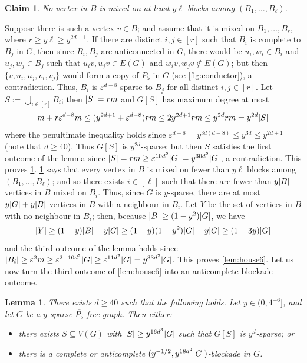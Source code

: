 \documentclass[11pt,reqno,a4paper]{amsart}
\newtheorem{lemma}[theorem]{Lemma}
\newtheorem{claim}{Claim}[theorem]
\let\oldendproof\endproof
\renewenvironment{proof}[1][\proofname]{%
	\oldproof[\normalfont\bfseries #1]%
}{\oldendproof}
\renewcommand{\qedsymbol}{$\blacksquare$}%
\newenvironment{subproof}[1][\normalfont\it Subproof]{%
	\renewcommand{\qedsymbol}{$\square$}%
	\begin{proof}[#1]%
	}{%
	\end{proof}%
}
\newcommand{\eps}{\varepsilon}
\newcommand{\nin}{\notin}
\renewcommand{\subset}{\subseteq}
\DeclarePairedDelimiter\abs{\lvert}{\rvert}%
\begin{document}
\begin{proof}
		\begin{claim}
			\label{claim:mixed}
			No vertex in $B$ is mixed on at least $y\ell$ blocks among $(B_1,\ldots,B_{\ell})$.
		\end{claim}
		\begin{subproof}
			Suppose there is such a vertex $v\in B$;
			and assume that it is mixed on $B_1,\ldots,B_r$, where $r\ge y\ell\ge y^{2d+1}$.
			If there are distinct $i,j\in[r]$ such that $B_i$ is complete to $B_j$ in $G$,
			then since $B_i,B_j$ are anticonnected in $G$,
			there would be $u_i,w_i\in B_i$ and $u_j,w_j\in B_j$ such that $u_iv,u_jv\in E(G)$ and $w_iv,w_jv\nin E(G)$;
			but then $\{v,u_i,u_j,v_i,v_j\}$ would form a copy of $\overline{P_5}$ in $G$ (see \cref{fig:conductor}), a contradiction.
			Thus, $B_i$ is $\eps^{d-8}$-sparse to $B_j$ for all distinct $i,j\in[r]$.
			Let $S:=\bigcup_{i\in[r]}B_i$; then $\abs S=rm$ and $G[S]$ has maximum degree at most
			\[m+r\eps^{d-8}m\le (y^{2d+1}+\eps^{d-8})rm
			\le 2y^{2d+1}rm\le y^{2d}rm=y^{2d}\abs S\]
			where the penultimate inequality holds since $\eps^{d-8}=y^{3d(d-8)}\le y^{3d}\le y^{2d+1}$ (note that $d\ge40$).
			Thus $G[S]$ is $y^{2d}$-sparse; but then $S$ satisfies the first outcome of the lemma since $\abs S=rm\ge \eps^{10d^2}\abs G=y^{30d^2}\abs G$, a contradiction.
			This proves \cref{claim:mixed}.
		\end{subproof}
		\cref{claim:mixed} says that every vertex in $B$ is mixed on fewer than $y\ell$ blocks among $(B_1,\ldots,B_{\ell})$;
		and so there exists $i\in[\ell]$
		such that there are fewer than $y\abs B$ vertices in $B$ mixed on $B_i$.
		Thus, since $G$ is $y$-sparse, there are at most $y\abs G+y\abs B$ vertices in $B$ with a neighbour in $B_i$.
		Let $Y$ be the set of vertices in $B$ with no neighbour in $B_i$; then, because $\abs B\ge (1-y^2)\abs G$, we have
		\[\abs Y\ge (1-y)\abs B-y\abs G\ge (1-y)(1-y^2)\abs G-y\abs G
		\ge (1-3y)\abs G\]
		and the third outcome of the lemma holds since $\abs{B_i}\ge \eps^2m\ge \eps^{2+10d^2}\abs G\ge \eps^{11d^2}\abs G=y^{33d^2}\abs G$.
		This proves \cref{lem:house6}.
	\end{proof}
	Let us now turn the third outcome of \cref{lem:house6} into an anticomplete blockade outcome.
	\begin{lemma}
		\label{lem:house7}
		There exists $d\ge40$ such that the following holds.
		Let $y\in(0,4^{-6}]$, and let $G$ be a $y$-sparse $\overline{P_5}$-free graph. Then either:
		\begin{itemize}
			\item there exists $S\subset V(G)$ with $\abs S\ge y^{16d^3}\abs G$ such that $G[S]$ is $y^d$-sparse; or
			
			\item there is a complete or anticomplete $(y^{-1/2},y^{18d^3}\abs G)$-blockade in $G$.
		\end{itemize}
	\end{lemma}
\end{document}

